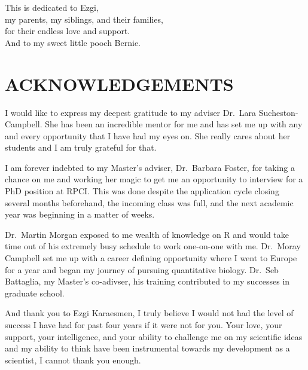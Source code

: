 \documentclass[]{DissertateOSU}
\begin{document}
\vspace*{\fill}

\begin{center}
    \doublespacing
    This is dedicated to Ezgi, \\
    my parents, my siblings, and their families, \\
    for their endless love and support. \\
    And to my sweet little pooch Bernie.
  \end{center}

\vspace*{\fill}

\newpage

\pagestyle{plain} \fancyhead[L]{} \fancyhead[R]{}
\fancyfoot[C]{\thepage} \chapter*{ACKNOWLEDGEMENTS}

\doublespacing

I would like to express my deepest gratitude to my adviser Dr.~Lara
Sucheston-Campbell. She has been an incredible mentor for me and has set
me up with any and every opportunity that I have had my eyes on. She
really cares about her students and I am truly grateful for that.

I am forever indebted to my Master's adviser, Dr.~Barbara Foster, for
taking a chance on me and working her magic to get me an opportunity to
interview for a PhD position at RPCI. This was done despite the
application cycle closing several months beforehand, the incoming class
was full, and the next academic year was beginning in a matter of weeks.

Dr.~Martin Morgan exposed to me wealth of knowledge on R and would take
time out of his extremely busy schedule to work one-on-one with me.
Dr.~Moray Campbell set me up with a career defining opportunity where I
went to Europe for a year and began my journey of pursuing quantitative
biology. Dr.~Seb Battaglia, my Master's co-adivser, his training
contributed to my successes in graduate school.

And thank you to Ezgi Karaesmen, I truly believe I would not had the
level of success I have had for past four years if it were not for you.
Your love, your support, your intelligence, and your ability to
challenge me on my scientific ideas and my ability to think have been
instrumental towards my development as a scientist, I cannot thank you
enough.
\end{document}
